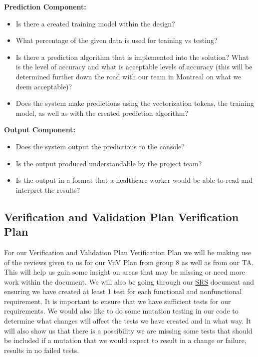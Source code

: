 \documentclass[12pt, titlepage]{article}
\begin{document}
  \noindent \textbf{Prediction Component:}
  \begin{itemize}
  \item Is there a created training model within the design?
  \item What percentage of the given data is used for training vs testing?
  \item Is there a prediction algorithm that is implemented into the solution? What is the level of accuracy and what is acceptable levels of accuracy (this will be determined further down the road with our team in Montreal on what we deem acceptable)?
  \item Does the system make predictions using the vectorization tokens, the training model, as well as with the created prediction algorithm?\\
  \end{itemize}
  
  
  \noindent \textbf{Output Component:}
  \begin{itemize}
  \item Does the system output the predictions to the console?
  \item Is the output produced understandable by the project team?
  \item Is the output in a format that a healthcare worker would be able to read and interpret the results?
  \end{itemize}
  
  
  \subsection{Verification and Validation Plan Verification Plan}\label{Verification and Validation Plan Verification Plan}
  
  For our Verification and Validation Plan Verification Plan we will be making use of the reviews given to us for our VnV Plan from group 8 as well as from our TA. This will help us gain some insight on areas that may be missing or need more work within the document. We will also be going through our \href{https://github.com/MichaelBreau/nlp-mentalhealth/blob/main/docs/SRS/index.pdf}{SRS} document and ensuring we have created at least 1 test for each functional and nonfunctional requirement. It is important to ensure that we have sufficient tests for our requirements. We would also like to do some mutation testing in our code to determine what changes will affect the tests we have created and in what way. It will also show us that there is a possibility we are missing some tests that should be included if a mutation that we would expect to result in a change or failure, results in no failed tests.\\ 
\end{document}
